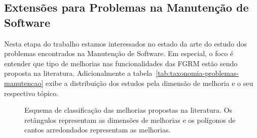 \subsection{Extensões para Problemas na Manutenção de Software}
\label{sub:extensões_para_problemas_na_manutenção_de_software}

Nesta etapa do trabalho estamos interessados no estado da arte do estudo dos
problemas encontrados na Manutenção de Software. Em especial, o foco é entender
que tipo de melhorias nas funcionalidades das FGRM estão sendo proposta na
literatura. Adicionalmente a tabela~\ref{tab:taxonomia-problemas-manutencao}
exibe a distribuição dos estudos pela dimensão de melhoria e o seu respectivo
tópico.



\begin{figure}[tb] \centering
	\caption{Esquema de classificação das melhorias propostas na literatura. Os
		retângulos representam as dimensões de melhorias e os polígonos de
		cantos arredondados representam as melhorias.}
	\label{fig:diagrama-esquema-dimensao-melhorias} \end{figure}

